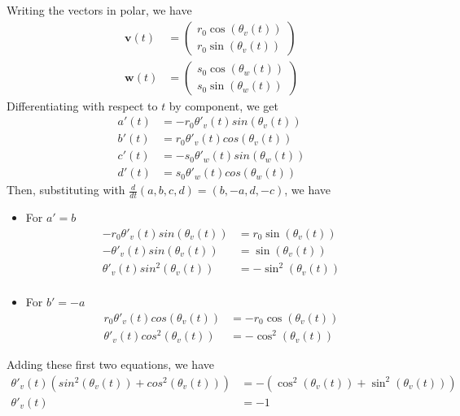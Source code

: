 \documentclass[12pt]{article}
\begin{document}
Writing the vectors in polar, we have
\begin{align*}
    \mathbf{v}(t) & = \begin{pmatrix} r_0\cos(\theta_v(t)) \\ r_0\sin(\theta_v(t)) \end{pmatrix} \\
    \mathbf{w}(t) & = \begin{pmatrix} s_0\cos(\theta_w(t)) \\ s_0\sin(\theta_w(t)) \end{pmatrix}
\end{align*}
Differentiating with respect to $t$ by component, we get
\begin{align*}
    a'(t) & = -r_0\theta'_v(t)sin(\theta_v(t)) \\
    b'(t) & = r_0\theta'_v(t)cos(\theta_v(t))  \\
    c'(t) & = -s_0\theta'_w(t)sin(\theta_w(t)) \\
    d'(t) & = s_0\theta'_w(t)cos(\theta_w(t))
\end{align*}
Then, substituting with $\frac{d}{dt}(a,b,c,d) = (b,-a,d,-c)$, we have
\begin{itemize}
    \item For $a' = b$
          \begin{align*}
              -r_0\theta'_v(t)sin(\theta_v(t)) & = r_0\sin(\theta_v(t)) \\
              -\theta'_v(t)sin(\theta_v(t))    & = \sin(\theta_v(t))    \\
              \theta'_v(t)sin^2(\theta_v(t))   & = -\sin^2(\theta_v(t)) \\
          \end{align*}
    \item For $b' = -a$
          \begin{align*}
              r_0\theta'_v(t)cos(\theta_v(t)) & = -r_0\cos(\theta_v(t)) \\
              \theta'_v(t)cos^2(\theta_v(t))  & = -\cos^2(\theta_v(t))
          \end{align*}
\end{itemize}

Adding these first two equations, we have
\begin{align*}
    \theta'_v(t)(sin^2(\theta_v(t)) + cos^2(\theta_v(t))) & = - (\cos^2(\theta_v(t)) + \sin^2(\theta_v(t))) \\
    \theta'_v(t)                                          & = -1
\end{align*}
\end{document}
